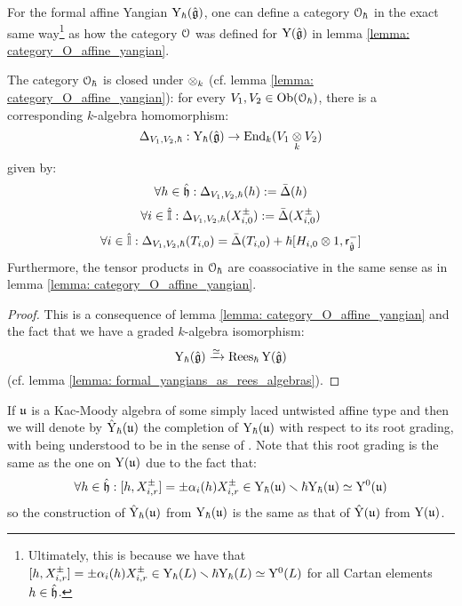         \begin{lemma} \label{lemma: category_O_formal_affine_yangian}
            For the formal affine Yangian $\mathrm{Y}_{\hbar}(\hat{\mathfrak{g}})$, one can define a category $\mathcal{O}_{\hbar}$ in the exact same way\footnote{Ultimately, this is because we have that $[h, X_{i, r}^{\pm}] = \pm \alpha_i(h) X_{i, r}^{\pm} \in \mathrm{Y}_{\hbar}(L) \smallsetminus \hbar\mathrm{Y}_{\hbar}(L) \simeq \mathrm{Y}^0(L)$ for all Cartan elements $h \in \hat{\mathfrak{h}}$.} as how the category $\mathcal{O}$ was defined for $\mathrm{Y}(\hat{\mathfrak{g}})$ in lemma \ref{lemma: category_O_affine_yangian}. 

            The category $\mathcal{O}_{\hbar}$ is closed under $\tensor_k$ (cf. lemma \ref{lemma: category_O_affine_yangian}): for every $V_1, V_2 \in \mathrm{Ob}(\mathcal{O}_{\hbar})$, there is a corresponding $k$-algebra homomorphism:
                $$\Delta_{V_1, V_2, \hbar}: \rmY_{\hbar}(\hat{\g}) \to \End_k(V_1 \tensor_k V_2)$$
            given by:
                $$\forall h \in \hat{\mathfrak{h}}: \Delta_{V_1, V_2, \hbar}(h) := \bar{\Delta}(h)$$
                $$\forall i \in \hat{\mathbb{I}}: \Delta_{V_1, V_2, \hbar}(X_{i, 0}^{\pm}) := \bar{\Delta}(X_{i, 0}^{\pm})$$
                $$\forall i \in \hat{\simpleroots}: \Delta_{V_1, V_2, \hbar}(T_{i, 0}) = \bar{\Delta}(T_{i, 0}) + \hbar [H_{i, 0} \tensor 1, \sfr_{ \hat{\g} }^- ]$$
            Furthermore, the tensor products in $\mathcal{O}_{\hbar}$ are coassociative in the same sense as in lemma \ref{lemma: category_O_affine_yangian}.
        \end{lemma}
            \begin{proof}
                This is a consequence of lemma \ref{lemma: category_O_affine_yangian} and the fact that we have a graded $k$-algebra isomorphism:
                    $$\mathrm{Y}_{\hbar}(\hat{\mathfrak{g}}) \xrightarrow[]{\simeq} \operatorname{Rees}_{\hbar} \mathrm{Y}(\hat{\mathfrak{g}})$$
                (cf. lemma \ref{lemma: formal_yangians_as_rees_algebras}).
            \end{proof}
        \begin{convention}
            If $\mathfrak{u}$ is a Kac-Moody algebra of some simply laced untwisted affine type and then we will denote by $\hat{\mathrm{Y}}_{\hbar}(\mathfrak{u})$ the completion of $\mathrm{Y}_{\hbar}(\mathfrak{u})$ with respect to its root grading, with  being understood to be in the sense of \cite[Appendix A]{wendlandt_formal_shift_operators_on_yangian_doubles}. Note that this root grading is the same as the one on $\mathrm{Y}(\mathfrak{u})$ due to the fact that:
                $$\forall h \in \hat{\mathfrak{h}}: [h, X_{i, r}^{\pm}] = \pm \alpha_i(h) X_{i, r}^{\pm} \in \mathrm{Y}_{\hbar}(\mathfrak{u}) \smallsetminus \hbar\mathrm{Y}_{\hbar}(\mathfrak{u}) \simeq \mathrm{Y}^0(\mathfrak{u})$$
            so the construction of $\hat{\mathrm{Y}}_{\hbar}(\mathfrak{u})$ from $\mathrm{Y}_{\hbar}(\mathfrak{u})$ is the same as that of $\hat{\mathrm{Y}}(\mathfrak{u})$ from $\mathrm{Y}(\mathfrak{u})$.
        \end{convention}
